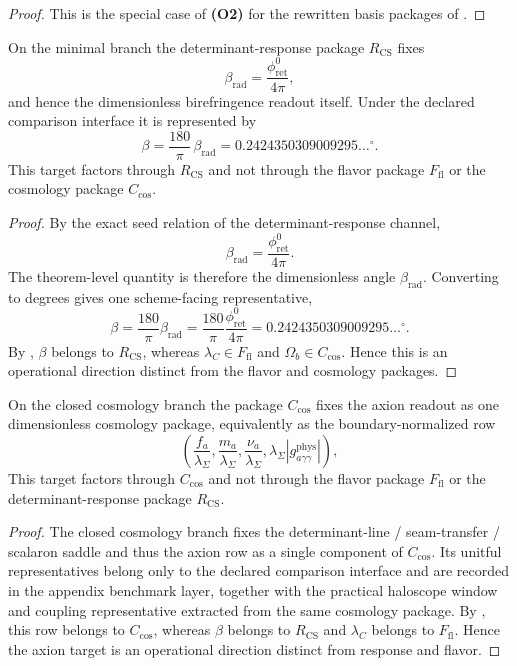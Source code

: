 \begin{proof}
This is the special case of \textbf{(O2)} for the rewritten basis packages of
.
\end{proof}

\begin{corollary}
\label{cor:response-birefringence-target}
On the minimal branch the determinant-response package $R_{\mathrm{CS}}$ fixes
\[
\beta_{\mathrm{rad}}=\frac{\phi_{\mathrm{ret}}^0}{4\pi},
\]
and hence the dimensionless birefringence readout itself. Under the declared comparison interface it
is represented by
\[
\beta
=
\frac{180}{\pi}\,\beta_{\mathrm{rad}}
=
0.2424350309009295\ldots^\circ.
\]
This target factors through $R_{\mathrm{CS}}$ and not through the flavor package
$F_{\mathrm{fl}}$ or the cosmology package $C_{\mathrm{cos}}$.
\end{corollary}

\begin{proof}
By the exact seed relation of the determinant-response channel,
\[
\beta_{\mathrm{rad}}=\frac{\phi_{\mathrm{ret}}^0}{4\pi}.
\]
The theorem-level quantity is therefore the dimensionless angle $\beta_{\mathrm{rad}}$. Converting
to degrees gives one scheme-facing representative,
\[
\beta=\frac{180}{\pi}\beta_{\mathrm{rad}}
=
\frac{180}{\pi}\frac{\phi_{\mathrm{ret}}^0}{4\pi}
=
0.2424350309009295\ldots^\circ.
\]
By , $\beta$ belongs to $R_{\mathrm{CS}}$, whereas
$\lambda_C\in F_{\mathrm{fl}}$ and $\Omega_b\in C_{\mathrm{cos}}$. Hence this is an operational
direction distinct from the flavor and cosmology packages.
\end{proof}

\begin{corollary}
\label{cor:cosmology-axion-target}
On the closed cosmology branch the package $C_{\mathrm{cos}}$ fixes the axion readout as one
dimensionless cosmology package, equivalently as the boundary-normalized row
\[
\left(
\frac{f_a}{\lambda_\Sigma},
\frac{m_a}{\lambda_\Sigma},
\frac{\nu_a}{\lambda_\Sigma},
\lambda_\Sigma\left|g_{a\gamma\gamma}^{\mathrm{phys}}\right|
\right),
\]
This target factors through $C_{\mathrm{cos}}$ and not through the flavor package
$F_{\mathrm{fl}}$ or the determinant-response package $R_{\mathrm{CS}}$.
\end{corollary}

\begin{proof}
The closed cosmology branch fixes the determinant-line / seam-transfer / scalaron saddle and thus
the axion row as a single component of $C_{\mathrm{cos}}$. Its unitful representatives belong only
to the declared comparison interface and are recorded in the appendix benchmark layer, together with
the practical haloscope window and coupling representative extracted from the same cosmology
package.
By , this row belongs to $C_{\mathrm{cos}}$, whereas $\beta$ belongs
to $R_{\mathrm{CS}}$ and $\lambda_C$ belongs to $F_{\mathrm{fl}}$. Hence the axion target is an
operational direction distinct from response and flavor.
\end{proof}

